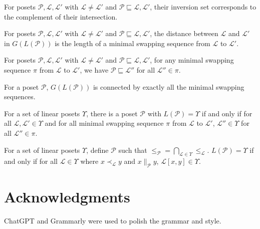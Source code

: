 \documentclass[12pt]{llncs}
\let\oldleq\leq
\renewcommand{\leq}[1][]{\oldleq_{#1}}
\newcommand{\poset}[1]{\mathcal{#1}}
\newcommand{\lang}[1]{L(#1)}
\newcommand{\sgraph}[1]{G(#1)}
\newcommand{\lext}{\sqsubseteq}
\newcommand{\incomp}[1][]{\parallel_{#1}}
\newcommand{\covered}[1][]{\prec_{#1}}
\newcommand{\swapfn}[2]{#1[#2]}
\begin{document}
\begin{lemma}
    For posets $\poset{P},\poset{L},\poset{L}'$ with $\poset{L} \!\neq\! \poset{L}'$ and $\poset{P} \lext \poset{L},\poset{L}'$, their inversion set corresponds to the complement of their intersection.
\end{lemma}

\begin{lemma}[\cite{R}]
    For posets $\poset{P},\poset{L},\poset{L}'$ with $\poset{L} \!\neq\! \poset{L}'$ and $\poset{P} \lext \poset{L},\poset{L}'$, the distance between $\poset{L}$ and $\poset{L}'$ in $\sgraph{\lang{\poset{P}}}$ is the length of a minimal swapping sequence from $\poset{L}$ to $\poset{L}'$.
\end{lemma}

\begin{lemma}
    For posets $\poset{P},\poset{L},\poset{L}'$ with $\poset{L} \!\neq\! \poset{L}'$ and $\poset{P} \lext \poset{L},\poset{L}'$, for any minimal swapping sequence $\pi$ from $\poset{L}$ to $\poset{L}'$, we have $\poset{P} \lext \poset{L}''$ for all $\poset{L}'' \!\in\! \pi$.
\end{lemma}

\begin{theorem}
    For a poset $\poset{P}$, $\sgraph{\lang{\poset{P}}}$ is connected by exactly all the minimal swapping sequences.
\end{theorem}

\begin{corollary}
    For a set of linear posets $\Upsilon$, there is a poset $\poset{P}$ with $\lang{\poset{P}} = \Upsilon$ if and only if for all $\poset{L}, \poset{L}' \!\in\! \Upsilon$ and for all minimal swapping sequence $\pi$ from $\poset{L}$ to $\poset{L}'$, $\poset{L}'' \!\in\! \Upsilon$ for all $\poset{L}'' \!\in\! \pi$.
\end{corollary}

\begin{corollary}
    For a set of linear posets $\Upsilon$, define $\poset{P}$ such that $\leq[\poset{P}] = \bigcap_{\poset{L} \in \Upsilon} \leq[\poset{L}]$. $\lang{\poset{P}} = \Upsilon$ if and only if for all $\poset{L} \!\in\! \Upsilon$ where $x \covered[\poset{L}] y$ and $x \incomp[\poset{P}] y$, $\swapfn{\poset{L}}{x,y} \!\in\! \Upsilon$.
\end{corollary}

\section*{Acknowledgments}

ChatGPT and Grammarly were used to polish the grammar and style.



\end{document}
